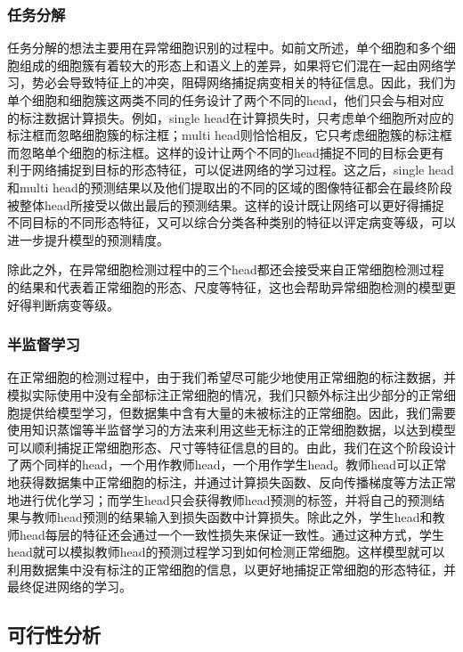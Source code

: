 \subsubsection{任务分解}
\par 任务分解的想法主要用在异常细胞识别的过程中。如前文所述，单个细胞和多个细胞组成的细胞簇有着较大的形态上和语义上的差异，如果将它们混在一起由网络学习，势必会导致特征上的冲突，阻碍网络捕捉病变相关的特征信息。因此，我们为单个细胞和细胞簇这两类不同的任务设计了两个不同的head，他们只会与相对应的标注数据计算损失。例如，single head在计算损失时，只考虑单个细胞所对应的标注框而忽略细胞簇的标注框；multi head则恰恰相反，它只考虑细胞簇的标注框而忽略单个细胞的标注框。这样的设计让两个不同的head捕捉不同的目标会更有利于网络捕捉到目标的形态特征，可以促进网络的学习过程。这之后，single head和multi head的预测结果以及他们提取出的不同的区域的图像特征都会在最终阶段被整体head所接受以做出最后的预测结果。这样的设计既让网络可以更好得捕捉不同目标的不同形态特征，又可以综合分类各种类别的特征以评定病变等级，可以进一步提升模型的预测精度。
\par 除此之外，在异常细胞检测过程中的三个head都还会接受来自正常细胞检测过程的结果和代表着正常细胞的形态、尺度等特征，这也会帮助异常细胞检测的模型更好得判断病变等级。
\subsubsection{半监督学习}
\par 在正常细胞的检测过程中，由于我们希望尽可能少地使用正常细胞的标注数据，并模拟实际使用中没有全部标注正常细胞的情况，我们只额外标注出少部分的正常细胞提供给模型学习，但数据集中含有大量的未被标注的正常细胞。因此，我们需要使用知识蒸馏等半监督学习的方法来利用这些无标注的正常细胞数据，以达到模型可以顺利捕捉正常细胞形态、尺寸等特征信息的目的。由此，我们在这个阶段设计了两个同样的head，一个用作教师head，一个用作学生head。教师head可以正常地获得数据集中正常细胞的标注，并通过计算损失函数、反向传播梯度等方法正常地进行优化学习；而学生head只会获得教师head预测的标签，并将自己的预测结果与教师head预测的结果输入到损失函数中计算损失。除此之外，学生head和教师head每层的特征还会通过一个一致性损失来保证一致性。通过这种方式，学生head就可以模拟教师head的预测过程学习到如何检测正常细胞。这样模型就可以利用数据集中没有标注的正常细胞的信息，以更好地捕捉正常细胞的形态特征，并最终促进网络的学习。

\subsection{可行性分析}

